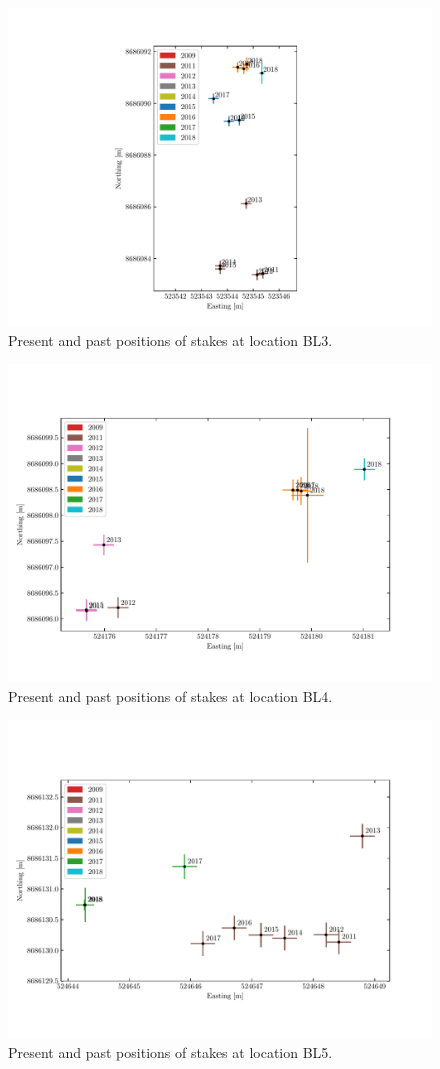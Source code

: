 \begin{figure}[H]
    \centering
    \includegraphics[width=.9\textwidth]{./figs/BL3_2d.pdf}
    \caption{Present and past positions of stakes at location BL3.}
    \label{GPS:fig:BL3_2d}
\end{figure}

\begin{figure}[H]
    \centering
    \includegraphics[width=.9\textwidth]{./figs/BL4_2d.pdf}
    \caption{Present and past positions of stakes at location BL4.}
    \label{GPS:fig:BL4_2d}
\end{figure}

\begin{figure}[H]
    \centering
    \includegraphics[width=.9\textwidth]{./figs/BL5_2d.pdf}
    \caption{Present and past positions of stakes at location BL5.}
    \label{GPS:fig:BL5_2d}
\end{figure}
